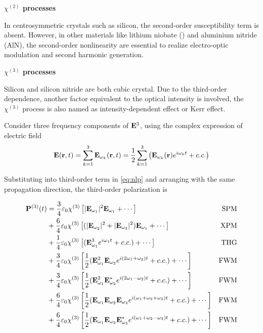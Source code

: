 \bigskip
\noindent\textbf{$\chi^{(2)}$ processes} 

In centrosymmetric crystals such as silicon, the second-order susceptibility term is absent. However, in other materials like lithium niobate () and aluminium nitride (AlN), the second-order nonlinearity are essential to realize electro-optic modulation and second harmonic generation.

\bigskip
\noindent\textbf{$\chi^{(3)}$ processes} 

Silicon and silicon nitride are both cubic crystal. Due to the third-order dependence, another factor equivalent to the optical intensity is involved, the $\chi^{(3)}$ process is also named as intensity-dependent effect or Kerr effect.

Consider three frequency components of $\vb{E}^3$, using the complex expression of electric field
\begin{equation}
    \vb{E}(\vb{r}, t) = \sum_{k=1}^3 \vb{E}_{\omega_k}(\vb{r}, t) =  \frac{1}{2} \sum_{k=1}^3 \qty ( \vb{E}_{\omega_k}(\vb{r})e^{i\omega_k t} + c.c.)
\end{equation}
\begin{figure}
    
    \label{fig:energy-level}
\end{figure}
Substituting into third-order term in \autoref{eq:nlp} and arranging with the same propagation direction, the third-order polarization is 

\begin{align}
  \vb{P}^{(3)}(t) 
  & = \frac{3}{4} \varepsilon_0 \chi^{(3)} \left[| \vb{E}_{\omega_1} |^2 \vb{E}_{\omega_1} + \cdots\right] & \mathrm{SPM} \\
  & + \frac{6}{4} \varepsilon_0 \chi^{(3)} \left[(| \vb{E}_{\omega_2} |^2 + |\vb{E}_{\omega_3} |^2) \vb{E}_{\omega_1} + \cdots \right] & \mathrm{XPM} \\
  & + \frac{1}{4} \varepsilon_0 \chi^{(3)} \left[(\vb{E}_{\omega_1}^3 e^{i \omega_1 t} + c.c.) + \cdots\right] & \mathrm{THG} \\
  & + \frac{3}{4} \varepsilon_0 \chi^{(3)} \left[ \frac{1}{2} (\vb{E}_{\omega_1}^2 \vb{E}_{\omega_2} e^{i (2 \omega_1 + \omega_2) t} + c.c.) + \cdots \right] & \mathrm{FWM} \label{eq:fwm1} \\ 
  & + \frac{3}{4} \varepsilon_0 \chi^{(3)} \left[ \frac{1}{2} (\vb{E}_{\omega_1}^2 \vb{E}^{\ast}_{\omega_2} e^{i (2 \omega_1 - \omega_2) t} + c.c.) + \cdots \right] & \mathrm{FWM} \label{eq:fwm2} \\ 
  & + \frac{6}{4} \varepsilon_0 \chi^{(3)} \left[ \frac{1}{2} (\vb{E}_{\omega_1} \vb{E}_{\omega_2} \vb{E}_{\omega_3} e^{i (\omega_1 + \omega_2 + \omega_3) t} + c.c.) + \cdots \right] & \mathrm{FWM}  \label{eq:fwm3} \\
  & + \frac{6}{4} \varepsilon_0 \chi^{(3)} \left[ \frac{1}{2} (\vb{E}_{\omega_1} \vb{E}_{\omega_2} \vb{E}^{\ast}_{\omega_3} e^{i (\omega_1 + \omega_2 - \omega_3) t} + c.c.) + \cdots \right] & \mathrm{FWM} \label{eq:fwm4}
\end{align}

